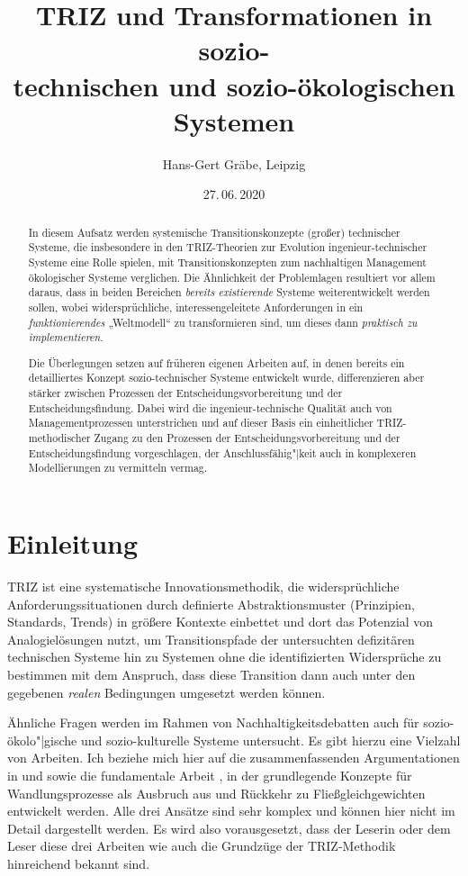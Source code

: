 \documentclass[12pt,a4paper]{article}
\title{TRIZ und Transformationen in sozio-\\ technischen und
  sozio-ökologischen Systemen}
\author{Hans-Gert Gräbe, Leipzig}
\date{27.\,06.\,2020}
\begin{document}
\maketitle

\begin{abstract}
  In diesem Aufsatz werden systemische Transitionskonzepte (großer)
  technischer Systeme, die insbesondere in den TRIZ-Theorien zur Evolution
  ingenieur-technischer Systeme eine Rolle spielen, mit Transitionskonzepten
  zum nachhaltigen Management ökologischer Systeme verglichen. Die Ähnlichkeit
  der Problemlagen resultiert vor allem daraus, dass in beiden Bereichen
  \emph{bereits existierende} Systeme weiterentwickelt werden sollen, wobei
  widersprüchliche, interessengeleitete Anforderungen in ein
  \emph{funktionierendes} „Weltmodell“ zu transformieren sind, um dieses dann
  \emph{praktisch zu implementieren}.

  Die Überlegungen setzen auf früheren eigenen Arbeiten auf, in denen bereits
  ein detailliertes Konzept sozio-technischer Systeme entwickelt wurde,
  differenzieren aber stärker zwischen Prozessen der Entscheidungsvorbereitung
  und der Entscheidungsfindung. Dabei wird die ingenieur-technische Qualität
  auch von Managementprozessen unterstrichen und auf dieser Basis ein
  einheitlicher TRIZ-methodischer Zugang zu den Prozessen der
  Entscheidungsvorbereitung und der Entscheidungsfindung vorgeschlagen, der
  Anschlussfähig"|keit auch in komplexeren Modellierungen zu vermitteln
  vermag.
\end{abstract}

\section{Einleitung}

TRIZ ist eine systematische Innovationsmethodik, die widersprüchliche
Anforderungssituationen durch definierte Abstraktionsmuster (Prinzipien,
Standards, Trends) in größere Kontexte einbettet und dort das Potenzial von
Analogielösungen nutzt, um Transitionspfade der untersuchten defizitären
technischen Systeme hin zu Systemen ohne die identifizierten Widersprüche zu
bestimmen mit dem Anspruch, dass diese Transition dann auch unter den
gegebenen \emph{realen} Bedingungen umgesetzt werden können.

Ähnliche Fragen werden im Rahmen von Nachhaltigkeitsdebatten auch für
sozio-ökolo"|gische und sozio-kulturelle Systeme untersucht. Es gibt hierzu
eine Vielzahl von Arbeiten. Ich beziehe mich hier auf die zusammenfassenden
Argumentationen in \cite{Foxon2009} und \cite{Geels2007} sowie die
fundamentale Arbeit \cite{Holling2001}, in der grundlegende Konzepte für
Wandlungsprozesse als Ausbruch aus und Rückkehr zu Fließgleichgewichten
entwickelt werden. Alle drei Ansätze sind sehr komplex und können hier nicht
im Detail dargestellt werden. Es wird also vorausgesetzt, dass der Leserin
oder dem Leser diese drei Arbeiten wie auch die Grundzüge der TRIZ-Methodik
hinreichend bekannt sind.
\end{document}
